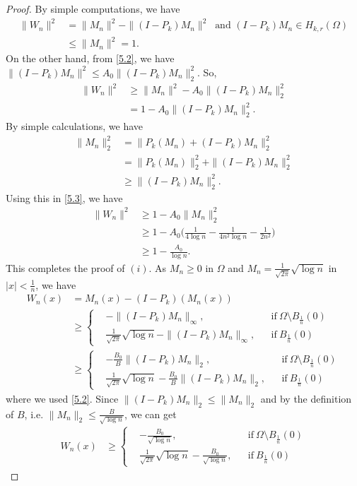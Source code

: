 \documentclass[11pt]{amsart}
\numberwithin{equation}{section}
\newcommand{\1}{\frac{1}{2}}
\begin{document}
	\begin{proof} By simple computations, we have
		\begin{align}
			\|W_n\|^2 &= \|M_n\|^2 - \|(I-P_k)M_n\|^2 \ \text{ and } (I-P_k)M_n \in H_{k,r}(\Omega) \nonumber\\
			& \leq \|M_n\|^2 = 1. \nonumber 
		\end{align}
		On the other hand, from \eqref{5.2}, we have $\|(I-P_k)M_n\|^2 \leq A_0 \|(I-P_k)M_n\|^2_2$. So,
		\begin{align}
			\label{5.3}
			\|W_n\|^2 &\geq \|M_n\|^2 - A_0 \|(I-P_k)M_n\|_2^2 \nonumber\\
			&= 1 - A_0\|(I-P_k)M_n\|^2_2.
		\end{align}
		By simple calculations, we have
		\begin{align}
			\|M_n\|^2_2 & = \|P_k(M_n)+ (I-P_k)M_n\|^2_2\nonumber\\
			&= \|P_k(M_n)\|^2_2 + \|(I-P_k)M_n\|_2^2\nonumber\\
			& \geq \|(I-P_k)M_n\|^2_2 \nonumber.
		\end{align}
		Using this in \eqref{5.3}, we have
		\begin{align*}
			\|W_n\|^2 &\geq 1 - A_0\|M_n\|^2_2\nonumber\\
			& \geq 1 - A_0 \Bigg( \frac{1}{4\log{n}}- \frac{1}{4n^2\log{n}}- \frac{1}{2n^2}\Bigg) \nonumber\\
			& \geq 1 - \frac{A_0}{\log{n}}.
		\end{align*}
		This completes the proof of $(i)$.
		As $M_n \geq 0$ in $\Omega$ and $M_n = \frac{1}{\sqrt{2\pi}}\sqrt{\log{n}}$ in $|x|<\frac{1}{n}$, we have
		\begin{align*}
			W_n(x) &= M_n(x)- (I-P_k)(M_n(x))\\
			&\geq \left\{ \begin{aligned}
				&-\|(I-P_k)M_n\|_\infty , && \mbox{if} \ \Omega\setminus B_{\frac{1}{n}}(0) \\
				& \frac{1}{\sqrt{2\pi}}\sqrt{\log{n}} - \|(I-P_k)M_n\|_\infty, && \mbox{if}\  B_{\frac{1}{n}}(0)
			\end{aligned}\right.\\
			&\geq \left\{ \begin{aligned}
				&-\frac{B_0}{B}\|(I-P_k)M_n\|_2 , && \mbox{if} \  \Omega\setminus B_{\frac{1}{n}}(0)\\
				& \frac{1}{\sqrt{2\pi}}\sqrt{\log{n}} - \frac{B_0}{B}\|(I-P_k)M_n\|_2, && \mbox{if}\  B_{\frac{1}{n}}(0)
			\end{aligned}\right.
		\end{align*}	
		where we used \eqref{5.2}. Since $\|(I-P_k)M_n\|_2 \leq \|M_n\|_2$ and by the definition of $B$, i.e. $\|M_n\|_2 \leq \frac{B}{\sqrt{\log{n}}}$, we can get
		\begin{align*}
			W_n(x)	&\geq \left\{ \begin{aligned}
				&-\frac{B_0}{\sqrt{\log{n}}} , && \mbox{if} \ \Omega\setminus B_{\frac{1}{n}}(0)\\
				& \frac{1}{\sqrt{2\pi}}\sqrt{\log{n}} - \frac{B_0}{\sqrt{\log{n}}}, && \mbox{if}\  B_{\frac{1}{n}}(0)
			\end{aligned}\right.
		\end{align*}
	\end{proof}
	
\end{document}
